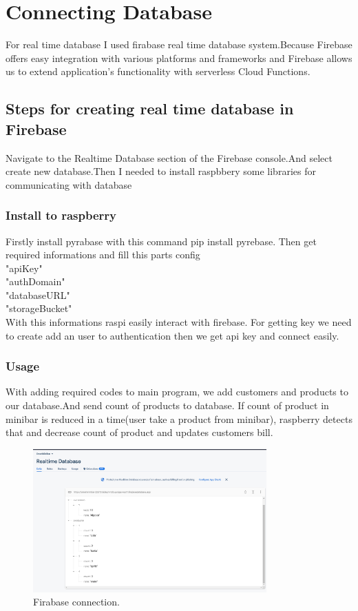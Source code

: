 \chapter{Connecting Database}
For real time database I used firabase real time database system.Because Firebase offers easy integration with various platforms and frameworks and Firebase allows us to extend application's functionality with serverless Cloud Functions.

\section{Steps for creating real time database in Firebase}
Navigate to the Realtime Database section of the Firebase console.And select create new database.Then I needed to install raspbbery some libraries for communicating with database

\subsection{Install to raspberry}
Firstly install pyrabase with this command pip install pyrebase. Then get required informations and fill this parts config\\
    "apiKey"\\
    "authDomain"\\
    "databaseURL"\\
    "storageBucket"\\

With this informations raspi easily interact with firebase. For getting key we need to create add an user to authentication then we get api key and connect easily.

\subsection{Usage}
With adding required codes to main program, we add customers and products to our database.And send count of products to database. If count of product in minibar is reduced in a time(user take a product from minibar), raspberry detects that and decrease count of product and updates customers bill.
\begin{figure}[!htbp]
    \centering
    \includegraphics[width=0.8\textwidth]{Imgs/databasefirebase.png}
    \caption{\label{fig:Firabase}Firabase connection.}
\end{figure}
\\

